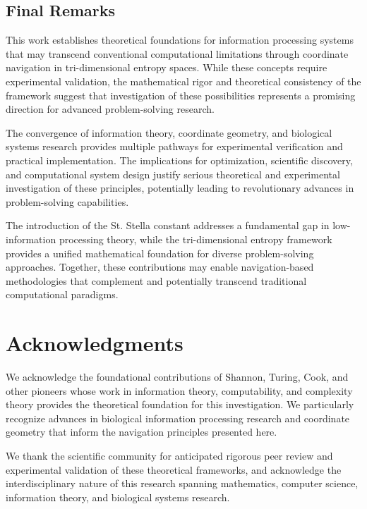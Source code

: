 \documentclass[11pt]{article}
\begin{document}
\subsection{Final Remarks}

This work establishes theoretical foundations for information processing systems that may transcend conventional computational limitations through coordinate navigation in tri-dimensional entropy spaces. While these concepts require experimental validation, the mathematical rigor and theoretical consistency of the framework suggest that investigation of these possibilities represents a promising direction for advanced problem-solving research.

The convergence of information theory, coordinate geometry, and biological systems research provides multiple pathways for experimental verification and practical implementation. The implications for optimization, scientific discovery, and computational system design justify serious theoretical and experimental investigation of these principles, potentially leading to revolutionary advances in problem-solving capabilities.

The introduction of the St. Stella constant addresses a fundamental gap in low-information processing theory, while the tri-dimensional entropy framework provides a unified mathematical foundation for diverse problem-solving approaches. Together, these contributions may enable navigation-based methodologies that complement and potentially transcend traditional computational paradigms.

\section*{Acknowledgments}

We acknowledge the foundational contributions of Shannon, Turing, Cook, and other pioneers whose work in information theory, computability, and complexity theory provides the theoretical foundation for this investigation. We particularly recognize advances in biological information processing research and coordinate geometry that inform the navigation principles presented here.

We thank the scientific community for anticipated rigorous peer review and experimental validation of these theoretical frameworks, and acknowledge the interdisciplinary nature of this research spanning mathematics, computer science, information theory, and biological systems research.
\end{document}
